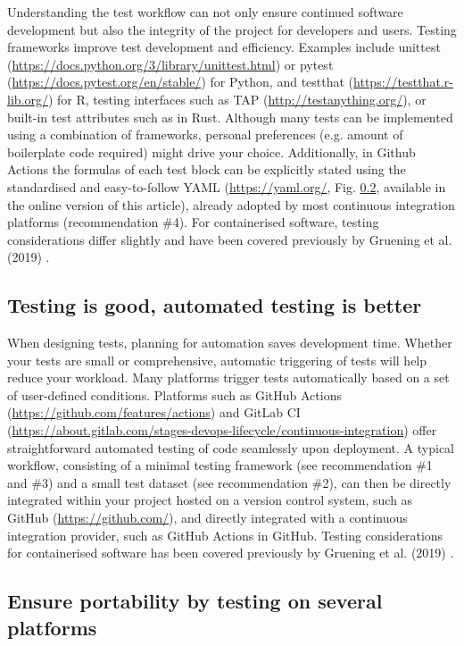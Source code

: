 Understanding the test workflow can not only ensure continued software development but also the integrity of the project for developers and users. Testing frameworks improve test development and efficiency. Examples include unittest (\url{https://docs.python.org/3/library/unittest.html}) or pytest (\url{https://docs.pytest.org/en/stable/}) for Python, and testthat (\url{https://testthat.r-lib.org/}) for R, testing interfaces such as TAP (\url{http://testanything.org/}), or built-in test attributes such as in Rust. Although many tests can be implemented using a combination of frameworks, personal preferences (e.g. amount of boilerplate code required) might drive your choice. Additionally, in Github Actions the formulas of each test block can be explicitly stated using the standardised and easy-to-follow YAML (\url{https://yaml.org/}, Fig. \ref{}, available in the online version of this article), already adopted by most continuous integration platforms (recommendation \#4). For containerised software, testing considerations differ slightly and have been covered previously by Gruening et al. (2019) \cite{gruening_recommendations_2019}.

\subsection{Testing is good, automated testing is better}

When designing tests, planning for automation saves development time. Whether your tests are small or comprehensive, automatic triggering of tests will help reduce your workload. Many platforms trigger tests automatically based on a set of user-defined conditions. Platforms such as GitHub Actions (\url{https://github.com/features/actions}) and GitLab CI (\url{https://about.gitlab.com/stages-devops-lifecycle/continuous-integration}) offer straightforward automated testing of code seamlessly upon deployment. A typical workflow, consisting of a minimal testing framework (see recommendation \#1 and \#3) and a small test dataset (see recommendation \#2), can then be directly integrated within your project hosted on a version control system, such as GitHub (\url{https://github.com/}), and directly integrated with a continuous integration provider, such as GitHub Actions in GitHub. Testing considerations for containerised software has been covered previously by Gruening et al. (2019) \cite{gruening_recommendations_2019}.

\subsection{Ensure portability by testing on several platforms}

